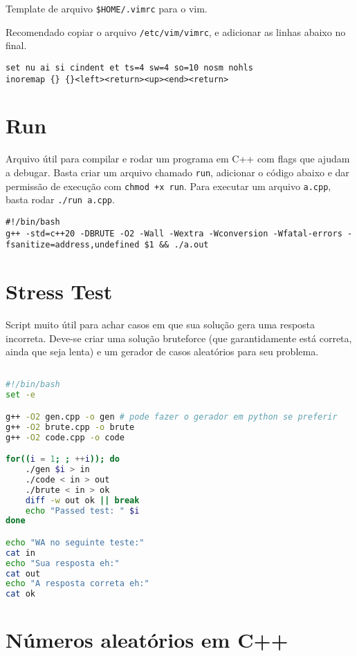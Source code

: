 Template de arquivo \texttt{\$HOME/.vimrc} para o vim.

Recomendado copiar o arquivo \texttt{/etc/vim/vimrc}, e adicionar as linhas abaixo no final.

\begin{lstlisting}
set nu ai si cindent et ts=4 sw=4 so=10 nosm nohls
inoremap {} {}<left><return><up><end><return>
\end{lstlisting}

\section{Run}

Arquivo útil para compilar e rodar um programa em C++ com flags que ajudam a debugar.
Basta criar um arquivo chamado \texttt{run}, adicionar o código abaixo e dar permissão de execução com \texttt{chmod +x run}.
Para executar um arquivo \texttt{a.cpp}, basta rodar \texttt{./run a.cpp}.

\begin{lstlisting}
#!/bin/bash
g++ -std=c++20 -DBRUTE -O2 -Wall -Wextra -Wconversion -Wfatal-errors -fsanitize=address,undefined $1 && ./a.out
\end{lstlisting}

\section{Stress Test}

Script muito útil para achar casos em que sua solução gera uma resposta incorreta.
Deve-se criar uma solução bruteforce (que garantidamente está correta, ainda que seja lenta) e um gerador de casos aleatórios para seu problema.

\begin{lstlisting}[language=Bash]

#!/bin/bash
set -e

g++ -O2 gen.cpp -o gen # pode fazer o gerador em python se preferir
g++ -O2 brute.cpp -o brute
g++ -O2 code.cpp -o code

for((i = 1; ; ++i)); do
    ./gen $i > in
    ./code < in > out
    ./brute < in > ok
    diff -w out ok || break
    echo "Passed test: " $i
done

echo "WA no seguinte teste:"
cat in
echo "Sua resposta eh:"
cat out
echo "A resposta correta eh:"
cat ok

\end{lstlisting}

\section{Números aleatórios em C++}

